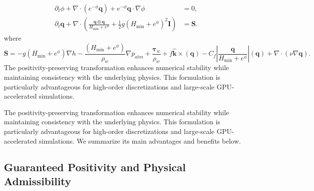 \documentclass[11pt]{article}
\begin{document}
\[
\boxed{
\begin{aligned}
\partial_t \phi
+
\nabla \cdot (e^{-\phi} \mathbf{q})
+
e^{-\phi} \mathbf{q} \cdot \nabla \phi
& = 0, \\
\partial_t \mathbf{q}
+
\nabla \cdot
\left(
\frac{\mathbf{q} \otimes \mathbf{q}}{H_{\min} + e^{\phi}}
+
\frac{1}{2} g (H_{\min} + e^{\phi})^2 \mathbf{I}
\right)
&= \mathbf{S} . 
\end{aligned}
}
\]
where
\begin{equation}
\bm{S}
=
- g (H_{\min} + e^{\phi}) \nabla h
- \frac{(H_{\min} + e^{\phi})}{\rho_w} \nabla p_{atm}
+ \frac{\bm{\tau}_w}{\rho_w}
+ f \hat{\bm{k}} \times (\bm{q})
- C_f |\frac{\mathbf{q} }{H_{\min} + e^{\phi}}| (\bm{q})
+ \nabla \cdot (\nu  \nabla \bm{q}).
\end{equation}
%
%
The positivity-preserving transformation enhances numerical stability while maintaining consistency with the underlying physics. This formulation is particularly advantageous for high-order discretizations and large-scale GPU-accelerated simulations.

The positivity-preserving transformation enhances numerical stability while maintaining consistency with the underlying physics. This formulation is particularly advantageous for high-order discretizations and large-scale GPU-accelerated simulations. We summarize its main advantages and benefits below.

\subsection{Guaranteed Positivity and Physical Admissibility}
\end{document}
